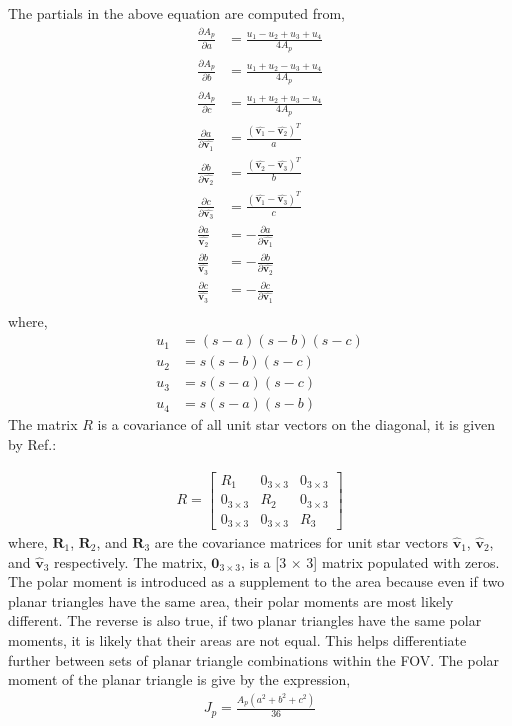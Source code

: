 \documentclass[]{aiaa-tc}%
\begin{document}
The partials in the above equation are computed from,
\begin{subequations}
\begin{align}
\frac{\partial A_p}{\partial a} &= \frac{u_1-u_2+u_3+u_4}{4A_p}\\
\frac{\partial A_p}{\partial b} &= \frac{u_1+u_2-u_3+u_4}{4A_p}\\
\frac{\partial A_p}{\partial c} &= \frac{u_1+u_2+u_3-u_4}{4A_p}\\
\frac{\partial a}{\partial \hat{\textbf{v}_1}} &= \frac{(\hat{\textbf{v}_1}- {\hat{\textbf{v}_2}})^T}{a}\\
\frac{\partial b}{\partial \hat{\textbf{v}_2}}&= \frac{(\hat{\textbf{v}_2}- {\hat{\textbf{v}_3}})^T}{b}\\
\frac{\partial c}{\partial \hat{\textbf{v}_3}} &= \frac{(\hat{\textbf{v}_1}- {\hat{\textbf{v}_3}})^T}{c}\\
\frac{\partial a}{\hat{\textbf{v}_2}} &= - \frac{\partial a}{\partial \hat{\textbf{v}_1}}\\
\frac{\partial b}{\hat{\textbf{v}_3}} &= - \frac{\partial b}{\partial \hat{\textbf{v}_2}}\\
\frac{\partial c}{\hat{\textbf{v}_3}} &= - \frac{\partial c}{\partial \hat{\textbf{v}_1}}\\
\end{align}
\end{subequations}
where,
\begin{subequations}
\begin{align}
u_1 &= (s-a)(s-b)(s-c)\\
u_2 &= s(s-b)(s-c)\\
u_3 &= s(s-a)(s-c)\\
u_4 &= s(s-a)(s-b)
\end{align}
\end{subequations}
The matrix $R$ is a covariance of all unit star vectors on the diagonal, it is given by Ref.:


\begin{align}
R = 
\begin{bmatrix}
 R_1 & 0_{3\times3} & 0_{3\times3}\\
 0_{3\times3} & R_2 & 0_{3\times3}\\
 0_{3\times3} & 0_{3\times3} & R_3
\end{bmatrix}
\end{align}
where, $\textbf{R}_1$,  $\textbf{R}_2$, and $\textbf{R}_3$ are the covariance matrices for unit star vectors $\hat{\textbf{v}}_1$, $\hat{\textbf{v}}_2$, and $\hat{\textbf{v}}_3$ respectively.
The matrix, $\textbf{0}_{3 \times 3}$, is a [3 $\times$ 3] matrix populated with zeros. The polar moment is introduced as
a supplement to the area because even if two planar triangles have the same area, their polar moments are most likely different. The reverse is also true, if two planar triangles have the same polar moments, it is likely that their areas are not equal. This helps differentiate further between sets of planar triangle combinations within the FOV. The polar moment of the planar triangle is give by the expression,
\begin{align}
J_p = \frac{A_p(a^2+b^2+c^2)}{36}
\end{align}
\end{document}
